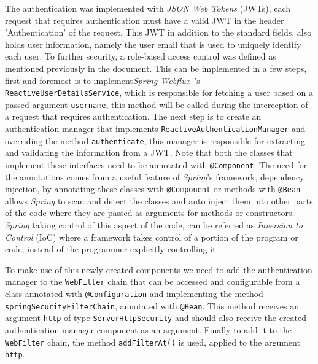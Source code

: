 The authentication was implemented with \textit{JSON Web Tokens} (JWTs), each request that requires authentication must have a valid JWT in the header 'Authentication' of the request. This JWT in addition to the standard fields, also holds user information, namely the user email that is used to uniquely identify each user. 
To further security, a role-based access control was defined as mentioned previously in the document. This can be implemented in a few steps, first and foremost is to implement\textit{Spring Webflux}~\cite{spring-webflux}'s \texttt{ReactiveUserDetailsService}, which is responsible for fetching a user based on a passed argument \texttt{username}, this method will be called during the interception of a request that requires authentication. The next step is to create an authentication manager that implements \texttt{ReactiveAuthenticationManager} and overriding the method \texttt{authenticate}, this manager is responsible for extracting and validating the information from a JWT. Note that both the classes that implement these interfaces need to be annotated with \texttt{@Component}. The need for the annotations comes from a useful feature of \textit{Spring}'s framework, dependency injection, by annotating these classes with \texttt{@Component} or methods with \texttt{@Bean} allows \textit{Spring} to scan and detect the classes and auto inject them into other parts of the code where they are passed as arguments for methods or constructors. \textit{Spring} taking control of this aspect of the code, can be referred as \textit{Inversion to Control} (IoC) where a framework takes control of a portion of the program or code, instead of the programmer explicitly controlling it.
 
To make use of this newly created components we need to add the authentication manager to the \texttt{WebFilter} chain that can be accessed and configurable from a class annotated with \texttt{@Configuration} and implementing the method \texttt{springSecurityFilterChain}, annotated with \texttt{@Bean}. 
This method receives an argument \texttt{http} of type \texttt{ServerHttpSecurity} and should also receive the created authentication manager component as an argument. 
Finally to add it to the \texttt{WebFilter} chain, the method \texttt{addFilterAt()} is used, applied to the argument \texttt{http}. 

